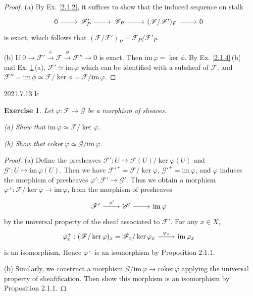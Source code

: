 \documentclass{amsart}
\newtheorem{exe}{Exercise}[subsection]
\theoremstyle{remark}\newtheorem{rmk}[theorem]{Remark}
\begin{document}
\begin{proof}
   (a) By Ex. \ref{2.1.2}, it suffices to show that the induced sequence on stalk
   \begin{equation*}
   	\begin{tikzcd}
   		0 \arrow[r] & \mathscr{F}^{\prime}_P \arrow[r] & \mathscr{F}_P \arrow[r] & (\mathscr{F}/\mathscr{F}^{\prime})_P \arrow[r] & 0
   	\end{tikzcd}
   \end{equation*}
   is exact, which follows that $(\mathscr{F}/\mathscr{F}')_{P}=\mathscr{F}_P/\mathscr{F}'_P$.
   
   (b) If $0 \rightarrow \mathscr{F}' \xrightarrow{\varphi} \mathscr{F} \xrightarrow{\phi} \mathscr{F}'' \rightarrow 0$ is exact. Then $\mathrm{im}\,{\varphi} = \ker{\phi}$. By Ex. \ref{2.1.4}\,(b) and Ex. \ref{2.1.7}\,(a), $\mathscr{F}'\simeq\mathrm{im}\,\varphi$ which can be identified with a subsheaf of $\mathscr{F}$, and $\mathscr{F}''=\mathrm{im}\,\phi\simeq \mathscr{F}/\ker\phi=\mathscr{F}/\mathrm{im}\,\varphi$.
\end{proof}

2021.7.13 lc
\begin{exe}
	\label{2.1.7}
	Let $\varphi:\mathscr{F}\to\mathscr{G}$ be a morphism of sheaves.
	
	(a) Show that $\mathrm{im}\,\varphi\simeq\mathscr{F}/\ker\varphi$.
	
	(b) Show that $\mathrm{coker}\,\varphi\simeq\mathscr{G}/\mathrm{im}\,\varphi$.
\end{exe}

\begin{proof}
	(a) Define the presheaves $\mathscr{F}':U\mapsto\mathscr{F}(U)/\ker\varphi(U)$ and $\mathscr{G}':U\mapsto\mathrm{im}\,\varphi(U)$. Then we have $\mathscr{F}'^+=\mathscr{F}/\ker\varphi$, $\mathscr{G}'^+=\mathrm{im}\,\varphi$, and $\varphi$ induces the morphism of presheaves $\varphi':\mathscr{F}'\to\mathscr{G}'$. Thus we obtain a morphism $\varphi^+:\mathscr{F}/\ker\varphi\rightarrow\mathrm{im}\,\varphi$, from the morphism of presheaves 
	\begin{equation*}
		\begin{tikzcd}
			\mathscr{F}^{\prime} \arrow[r, "\varphi^{\prime}"] & \mathscr{G}^{\prime} \arrow[r] & {\mathrm{im}\,\varphi}
		\end{tikzcd}
	\end{equation*}
	by the universal property of the sheaf associated to $\mathscr{F}'$. For any $x\in X$,
	\begin{equation*}
		\begin{tikzcd}
			\varphi^+_x:(\mathscr{F}/\ker\varphi)_x=\mathscr{F}_x/\ker\varphi_x \arrow[r, "\varphi_x"] & {\mathrm{im}\,\varphi_x}
		\end{tikzcd}
	\end{equation*}
	is an isomorphism. Hence $\varphi^+$ is an isomorphism by Proposition 2.1.1.
	
	(b) Similarly, we construct a morphism $\mathscr{G}/\mathrm{im}\,\varphi\to\mathrm{coker}\,\varphi$ applying the universal property of sheafification. Then show this morphism is an isomorphism by Proposition 2.1.1.
\end{proof}
\end{document}
